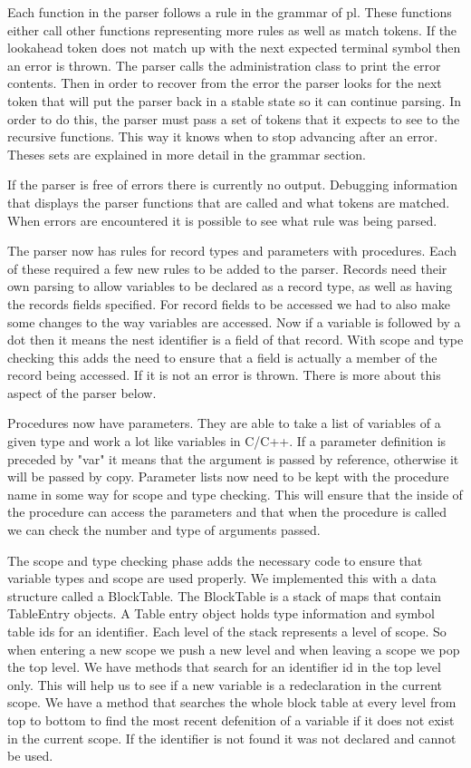\documentclass{article}
\begin{document}
Each function in the parser follows a rule in the grammar
of pl. These functions either call other functions representing more rules as well as match
tokens. If the lookahead token does not match up with the next expected terminal symbol then an
error is thrown. The parser calls the administration class to print the error contents. Then in
order to recover from the error the parser looks for the next token that will put the parser back
in a stable state so it can continue parsing. In order to do this, the parser must pass a set of
tokens that it expects to see to the recursive functions. This way it knows when to stop
advancing after an error. Theses sets are explained in more detail in the grammar section.

If the parser is free of errors there is currently no output. Debugging information that displays
the parser functions that are called and what tokens are matched. When errors are encountered
it is possible to see what rule was being parsed.

The parser now has rules for record types and parameters with procedures. Each of these
required a few new rules to be added to the parser. Records need their own parsing to
allow variables to be declared as a record type, as well as having the records fields
specified. For record fields to be accessed we had to also make some changes to the
way variables are accessed. Now if a variable is followed by a dot then it means the
nest identifier is a field of that record. With scope and type checking this adds the need
to ensure that a field is actually a member of the record being accessed. If it is not an
error is thrown. There is more about this aspect of the parser below.

Procedures now have parameters. They are able to take a list of variables of a given type
and work a lot like variables in C/C++. If a parameter definition is preceded by "var" it
means that the argument is passed by reference, otherwise it will be passed by copy.
Parameter lists now need to be kept with the procedure name in some way for scope and
type checking. This will ensure that the inside of the procedure can access the parameters
and that when the procedure is called we can check the number and type of arguments passed.

The scope and type checking phase adds the necessary code to ensure that variable types and
scope are used properly. We implemented this with a data structure called a BlockTable.
The BlockTable is a stack of maps that contain TableEntry objects. A Table entry object holds
type information and symbol table ids for an identifier. Each level of the stack represents a
level of scope. So when entering a new scope we push a new level and when leaving a scope
we pop the top level. We have methods that search for an identifier id in the top level
only. This will help us to see if a new variable is a redeclaration in the current scope.
We have a method that searches the whole block table at every level from top to bottom to
find the most recent defenition of a variable if it does not exist in the current scope.
If the identifier is not found it was not declared and cannot be used.
\end{document}
